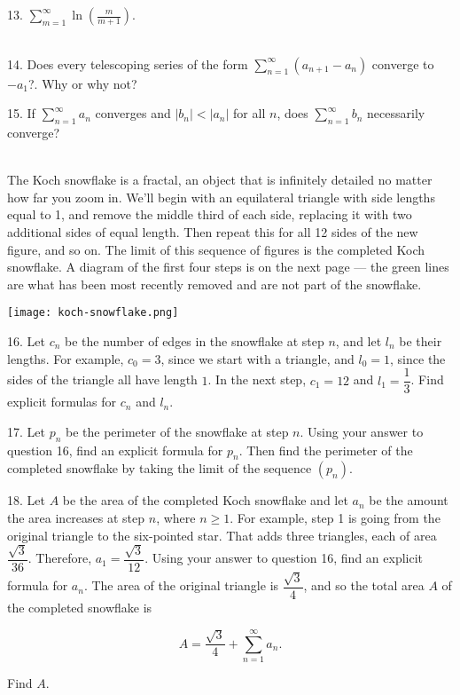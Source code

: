 \documentclass{article}
\begin{document}
13. $\displaystyle \sum_{m = 1}^\infty \ln\left( \frac{m}{m + 1} \right)$.

~\\

14. Does every telescoping series of the form $\displaystyle \sum_{n = 1}^\infty (a_{n + 1} - a_n)$ converge to $-a_1$?. Why or why not?

15. If $\displaystyle \sum_{n = 1}^\infty a_n$ converges and $|b_n| < |a_n|$ for all $n$, does $\displaystyle \sum_{n = 1}^\infty b_n$ necessarily converge?

~\\

The Koch snowflake is a fractal, an object that is infinitely detailed no matter how far you zoom in. We'll begin with an equilateral triangle with side lengths equal to 1, and remove the middle third of each side, replacing it with two additional sides of equal length. Then repeat this for all 12 sides of the new figure, and so on. The limit of this sequence of figures is the completed Koch snowflake. A diagram of the first four steps is on the next page --- the green lines are what has been most recently removed and are not part of the snowflake.

\begin{center}
	\texttt{[image: koch-snowflake.png]}
\end{center}

16. Let $c_n$ be the number of edges in the snowflake at step $n$, and let $l_n$ be their lengths. For example, $c_0 = 3$, since we start with a triangle, and $l_0 = 1$, since the sides of the triangle all have length $1$. In the next step, $c_1 = 12$ and $l_1 = \dfrac{1}{3}$. Find explicit formulas for $c_n$ and $l_n$.

17. Let $p_n$ be the perimeter of the snowflake at step $n$. Using your answer to question 16, find an explicit formula for $p_n$. Then find the perimeter of the completed snowflake by taking the limit of the sequence $(p_n)$.

18. Let $A$ be the area of the completed Koch snowflake and let $a_n$ be the amount the area increases at step $n$, where $n \geq 1$. For example, step 1 is going from the original triangle to the six-pointed star. That adds three triangles, each of area $\dfrac{\sqrt{3}}{36}$. Therefore, $a_1 = \dfrac{\sqrt{3}}{12}$. Using your answer to question 16, find an explicit formula for $a_n$. The area of the original triangle is $\dfrac{\sqrt{3}}{4}$, and so the total area $A$ of the completed snowflake is 

$$
	A = \frac{\sqrt{3}}{4} + \sum_{n = 1}^\infty a_n.
$$

Find $A$.
\end{document}
